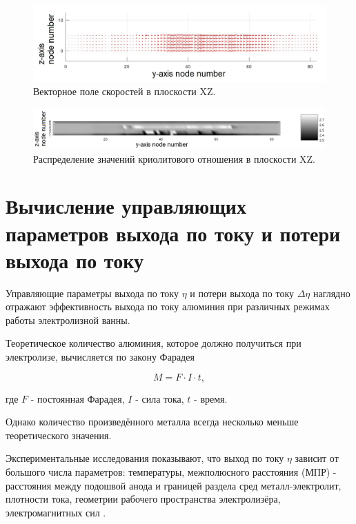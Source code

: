 \documentclass[pdflatex,sn-mathphys-gost]{pmi-jnl}
\begin{document}
\begin{figure}[ht]
    \centering
    \includegraphics[width=\textwidth]{veloyz_art.png}
    \caption{Векторное поле скоростей в плоскости XZ.}
    \label{fig:veloyz}
\end{figure}

\begin{figure}[ht]
    \centering
    \includegraphics[width=\textwidth]{heatmapyz_art.png}
    \caption{Распределение значений криолитового отношения в плоскости XZ.}
    \label{fig:cryz}
\end{figure}

\section{Вычисление управляющих параметров выхода по току и потери выхода по току}

Управляющие параметры выхода по току $\eta$ и потери выхода по току $\Delta \eta$ наглядно отражают эффективность выхода по току алюминия при различных режимах работы электролизной ванны.

Теоретическое количество алюминия, которое должно получиться при электролизе, вычисляется по закону Фарадея

\begin{equation}\label{eq:farad}
	M = F \cdot I \cdot t,
\end{equation}

где $F$ - постоянная Фарадея, $I$ - сила тока, $t$ - время.

Однако количество произведённого металла всегда несколько меньше теоретического значения.

Экспериментальные исследования показывают, что выход по току $\eta$ зависит от большого числа параметров: температуры, межполюсного расстояния (МПР) - расстояния между подошвой анода и границей раздела сред металл-электролит, плотности тока, геометрии рабочего пространства электролизёра, электромагнитных сил \cite{litlink:belo}.
\end{document}
